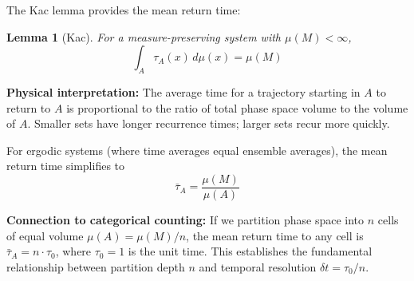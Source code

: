 \documentclass[twocolumn,10pt]{article}
\newtheorem{lemma}[theorem]{Lemma}
\theoremstyle{remark}
\begin{document}
The Kac lemma \cite{kac1947} provides the mean return time:

\begin{lemma}[Kac]
\label{lem:kac}
For a measure-preserving system with $\mu(M) < \infty$,
\begin{equation}
    \int_A \tau_A(x) \, d\mu(x) = \mu(M)
    \label{eq:kac_lemma}
\end{equation}
\end{lemma}

\textbf{Physical interpretation:} The average time for a trajectory starting in $A$ to return to $A$ is proportional to the ratio of total phase space volume to the volume of $A$. Smaller sets have longer recurrence times; larger sets recur more quickly.

For ergodic systems (where time averages equal ensemble averages), the mean return time simplifies to
\begin{equation}
    \bar{\tau}_A = \frac{\mu(M)}{\mu(A)}
    \label{eq:ergodic_return_time}
\end{equation}

\textbf{Connection to categorical counting:} If we partition phase space into $n$ cells of equal volume $\mu(A) = \mu(M)/n$, the mean return time to any cell is $\bar{\tau}_A = n \cdot \tau_0$, where $\tau_0 = 1$ is the unit time. This establishes the fundamental relationship between partition depth $n$ and temporal resolution $\delta t = \tau_0/n$.
\end{document}
